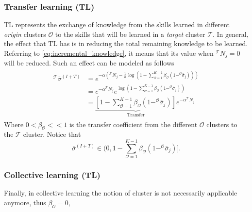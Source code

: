 \subsubsection{\textbf{Transfer learning (TL)}}
TL represents the exchange of knowledge from the skills learned in different \emph{origin} clusters $\mathcal{O}$ to the skills that will be learned in a \emph{target} cluster $\mathcal{T}$. In general, the effect that TL has is in reducing the total remaining knowledge to be learned. Referring to \eqref{eq:incremental_knowledge}, it means that its value when $^\mathcal{T}N_j = 0$ will be reduced. Such an effect can be modeled as follows
\begin{align}
    \begin{split}
        ^\mathcal{T}\bar{\sigma}^{(I+T)} &= e^{-\alpha \left(^\mathcal{T}N_j - \frac{1}{\alpha}  \log\left( 1- \sum^{K-1}_{\mathcal{O}=1}\beta_\mathcal{O}(1 - ^\mathcal{O}\bar{\sigma}_j) \right) \right)}\\
             &= e^{-\alpha {{^\mathcal{T}}N_j}}e^{  \log\left( 1-\sum^{K-1}_{\mathcal{O}=1}\beta_\mathcal{O}(1 - ^\mathcal{O}\bar{\sigma}_j) \right) }\\
             &= \underbrace{\left[1- \sum^{K-1}_{\mathcal{O}=1}\beta_\mathcal{O} \left( 1 - ^\mathcal{O}\bar{\sigma}_j \right)\right]}_{\text{Transfer}}e^{-\alpha ^\mathcal{T}N_j}    
    \end{split}
\end{align}
Where $0<\beta_\mathcal{O} << 1$ is the transfer coefficient from the different $\mathcal{O}$ clusters to the $\mathcal{T}$ cluster. Notice that 
\begin{equation*}
 \bar{\sigma}^{(I+T)} \in (0, 1- \sum^{K-1}_{\mathcal{O}=1}\beta_\mathcal{O}(1 - ^\mathcal{O}\bar{\sigma}_j)].
\end{equation*}


\subsubsection{\textbf{Collective learning (TL)}}
Finally, in collective learning the notion of cluster is not necessarily applicable anymore, thus $\beta_\mathcal{O} = 0$,

